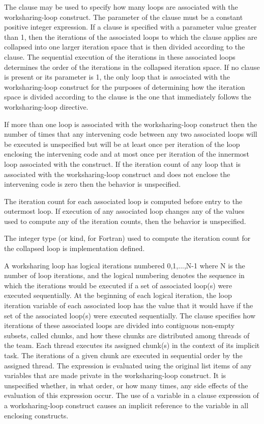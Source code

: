 The  clause may be used to specify how many loops are
associated with the worksharing-loop construct. The parameter of the 
clause must be a constant positive integer expression. If a 
clause is specified with a parameter value greater than 1, then the
iterations of the associated loops to which the clause applies are collapsed
into one larger iteration space that is then divided according
to the  clause. The sequential execution of the iterations
in these associated loops determines the order of the iterations in the
collapsed iteration space. If no  clause is present or its
parameter is 1, the only loop that is associated with the worksharing-loop construct
for the purposes of determining how the iteration space is divided according
to the  clause is the one that immediately follows the
worksharing-loop directive.

If more than one loop is associated with the worksharing-loop construct then the
number of times that any intervening code between any two associated
loops will be executed is unspecified but will be at least once per
iteration of the loop enclosing the intervening code and at most once
per iteration of the innermost loop associated with the construct. If the
iteration count of any loop that is associated with the worksharing-loop construct and does not
enclose the intervening code is zero then the behavior is unspecified.

The iteration count for each associated loop is computed before entry to the
outermost loop. If execution of any associated loop changes any of the values
used to compute any of the iteration counts, then the behavior is unspecified.

The integer type (or kind, for Fortran) used to compute the iteration count
for the collapsed loop is implementation defined.

 A worksharing loop has
logical iterations numbered 0,1,...,N-1 where N is the number of loop
iterations, and the logical numbering denotes the sequence in which
the iterations would be executed if a set of associated loop(s) were
executed sequentially.  At the beginning of each logical iteration,
the loop iteration variable of each associated loop has the value that
it would have if the set of the associated loop(s) were executed
sequentially.  The  clause specifies how iterations of
these associated loops are divided into contiguous non-empty subsets,
called chunks, and how these chunks are distributed among threads of
the team. Each thread executes its assigned chunk(s) in the context of
its implicit task.  The iterations of a given chunk are executed in
sequential order by the assigned thread.  The 
expression is evaluated using the original list items of any variables
that are made private in the worksharing-loop construct. It is unspecified
whether, in what order, or how many times, any side effects of the
evaluation of this expression occur. The use of a variable in a
 clause expression of a worksharing-loop construct causes an
implicit reference to the variable in all enclosing constructs.

